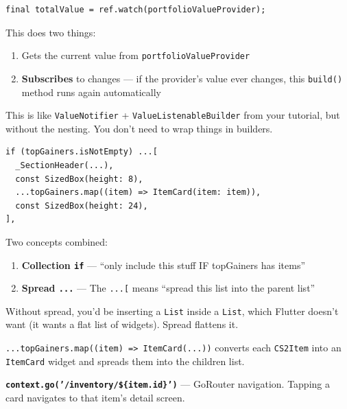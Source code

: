 \documentclass[11pt, a4paper]{article}
\begin{document}
\begin{conceptbox}[title=\textbf{ref.watch() in Build Methods}]
\begin{lstlisting}[numbers=none]
final totalValue = ref.watch(portfolioValueProvider);
\end{lstlisting}

This does two things:
\begin{enumerate}
    \item Gets the current value from \texttt{portfolioValueProvider}
    \item \textbf{Subscribes} to changes --- if the provider's value ever changes, this \texttt{build()} method runs again automatically
\end{enumerate}

This is like \texttt{ValueNotifier} + \texttt{ValueListenableBuilder} from your tutorial, but without the nesting. You don't need to wrap things in builders.
\end{conceptbox}

\begin{conceptbox}[title=\textbf{Collection \texttt{if} with Spread \texttt{...[~]}}]
\begin{lstlisting}[numbers=none]
if (topGainers.isNotEmpty) ...[
  _SectionHeader(...),
  const SizedBox(height: 8),
  ...topGainers.map((item) => ItemCard(item: item)),
  const SizedBox(height: 24),
],
\end{lstlisting}

Two concepts combined:
\begin{enumerate}
    \item \textbf{Collection \texttt{if}} --- ``only include this stuff IF topGainers has items''
    \item \textbf{Spread \texttt{...}} --- The \texttt{...[} means ``spread this list into the parent list''
\end{enumerate}

Without spread, you'd be inserting a \texttt{List} inside a \texttt{List}, which Flutter doesn't want (it wants a flat list of widgets). Spread flattens it.

\texttt{...topGainers.map((item) => ItemCard(...))} converts each \texttt{CS2Item} into an \texttt{ItemCard} widget and spreads them into the children list.
\end{conceptbox}

\textbf{\texttt{context.go('/inventory/\$\{item.id\}')}} --- GoRouter navigation. Tapping a card navigates to that item's detail screen.
\end{document}
